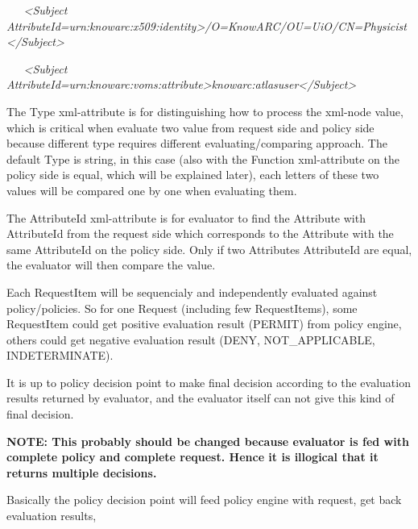 \documentclass[a4paper]{article}
\begin{document}
{\itshape\color{black}
\ \ \ {\textless}Subject
AttributeId={\textquotedbl}urn:knowarc:x509:identity{\textquotedbl}{\textgreater}/O=KnowARC/OU=UiO/CN=Physicist{\textless}/Subject{\textgreater}}

{\itshape\color{black}
\ \ \ {\textless}Subject
AttributeId={\textquotedbl}urn:knowarc:voms:attribute{\textgreater}knowarc:atlasuser{\textless}/Subject{\textgreater}}

{\color{black}
The {\textquotedbl}Type{\textquotedbl} xml-attribute is for
distinguishing how to process the xml-node value, which is critical
when evaluate two value from request side and policy side because
different type requires different evaluating/comparing approach. The
default {\textquotedbl}Type{\textquotedbl} is
{\textquotedbl}string{\textquotedbl}, in this case (also with the
{\textquotedbl}Function{\textquotedbl} xml-attribute on the policy side
is {\textquotedbl}equal{\textquotedbl}, which will be explained later),
each letters of these two values will be compared one by one when
evaluating them.}

{\color{black}
The {\textquotedbl}AttributeId{\textquotedbl} xml-attribute is for
evaluator to find the Attribute with AttributeId from the request side
which corresponds to the Attribute with the same AttributeId on the
policy side. Only if two Attributes{\textquotesingle} AttributeId are
equal, the evaluator will then compare the value.}

{\color{black}
Each RequestItem will be sequencialy and independently evaluated against
policy/policies. So for one Request (including few RequestItems), some
RequestItem could get positive evaluation result (PERMIT) from policy
engine, others could get negative evaluation result (DENY,
NOT\_APPLICABLE, INDETERMINATE).}

{\color{black}
It is up to policy decision point to make final decision according to
the evaluation results returned by evaluator, and the evaluator itself
can not give this kind of final decision.}

{\bfseries\color{black}
NOTE: This probably should be changed because evaluator is fed with
complete policy and complete request. Hence it is illogical that it
returns multiple decisions.}

{\color{black}
Basically the policy decision point will feed policy engine with
request, get back evaluation results, }
\end{document}
